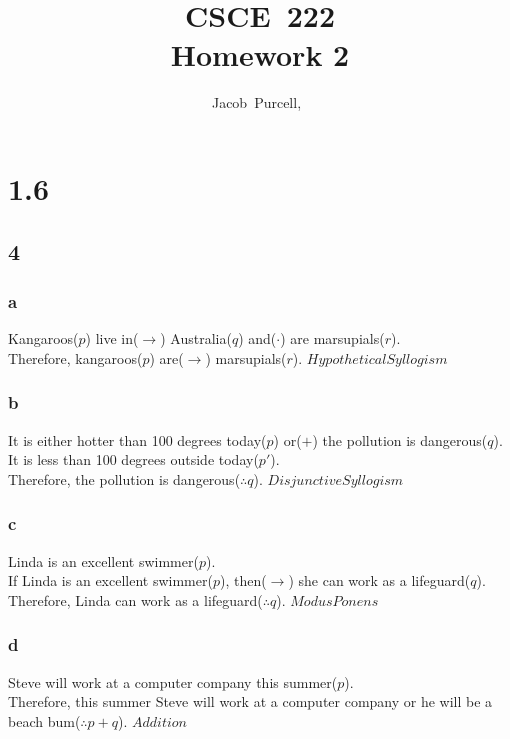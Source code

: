 \documentclass[journal]{IEEEtran}
\begin{document}
\title{CSCE~222 \\ Homework 2}

\author{Jacob~Purcell,~}

\maketitle


\section*{1.6}
	\subsection*{4}
		\subsubsection{a}
		Kangaroos($p$) live in($\rightarrow$) Australia($q$) and($\cdot$) are marsupials($r$). \\
		Therefore, kangaroos($p$) are($\rightarrow$) marsupials($r$). $\boxed{Hypothetical Syllogism}$

		\subsubsection{b}
		It is either hotter than 100 degrees today($p$) or($+$) the pollution is dangerous($q$). \\
		It is less than 100 degrees outside today($p'$). \\
		Therefore, the pollution is dangerous($\therefore q$). $\boxed{Disjunctive Syllogism}$

		\subsubsection{c}
		Linda is an excellent swimmer($p$). \\
		If Linda is an excellent swimmer($p$), then($\rightarrow$) she can work as a lifeguard($q$).\\
		Therefore, Linda can work as a lifeguard($\therefore q$). $\boxed{Modus Ponens}$

		\subsubsection{d}
		Steve will work at a computer company this summer($p$).\\
		Therefore, this summer Steve will work at a computer
		company or he will be a beach bum($\therefore p+q$). $\boxed{Addition}$
\end{document}
